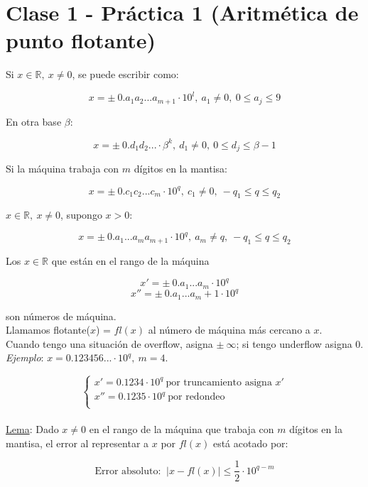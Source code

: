 \section{Clase 1 - Pr\'actica 1 (Aritm\'etica de punto flotante)}

Si $x \in \mathbb{R},\ x \neq 0$, se puede escribir como:

$$x = \pm \ 0.a_{1}a_{2}...a_{m + 1}\cdot10^{l},\ a_{1} \neq 0,\ 0 \leq a_{j} \leq 9$$

En otra base $\beta$:

$$x = \pm \ 0.d_{1}d_{2}...\cdot\beta^{k},\ d_{1} \neq 0,\ 0 \leq d_{j} \leq \beta - 1$$

Si la m\'aquina trabaja con $m$ d\'igitos en la mantisa:

$$x = \pm \ 0.c_{1}c_{2}...c_{m}\cdot 10^{q},\ c_{1} \neq 0,\ -q_{1} \leq q \leq q_{2}$$

$x \in \mathbb{R},\ x \neq 0$, supongo $x > 0$:

$$x = \pm \ 0.a_{1}...a_{m}a_{m + 1}\cdot 10^{q},\ a_{m} \neq q,\ -q_{1} \leq q \leq q_{2}$$

Los $x \in \mathbb{R}$ que est\'an en el rango de la m\'aquina

$$x' = \pm \ 0.a_{1}...a_{m}\cdot 10^{q}$$
$$x'' = \pm \ 0.a_{1}...a_{m} + 1\cdot 10^{q}$$

son n\'umeros de m\'aquina.\\

Llamamos flotante($x$) = $fl(x)$ al n\'umero de m\'aquina m\'as cercano a $x$.\\

Cuando tengo una situaci\'on de overflow, asigna $\pm \ \infty$; si tengo underflow asigna 0.\\

\textit{Ejemplo}: $x = 0.123456...\cdot 10^{q},\ m = 4$.

$$
    \begin{cases}
        x' = 0.1234\cdot 10^{q}\ \text{por truncamiento asigna } x'\\
        x'' = 0.1235\cdot 10^{q}\ \text{por redondeo}\\
    \end{cases}
$$\\

\underline{Lema}: Dado $x \neq 0$ en el rango de la m\'aquina que trabaja con $m$ d\'igitos en la mantisa, el error al representar a $x$ por $fl(x)$ est\'a acotado por:

$$\text{Error absoluto: }\ |x - fl(x)| \leq \frac{1}{2}\cdot 10^{q - m}$$

